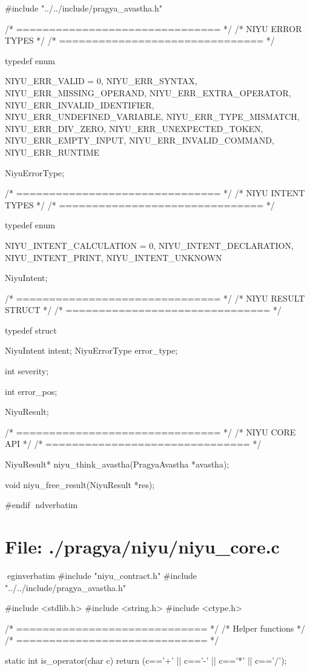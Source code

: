 \documentclass{article}
\begin{document}
#include "../../include/pragya_avastha.h"

/* =============================== */
/* NIYU ERROR TYPES                */
/* =============================== */

typedef enum {

    NIYU_ERR_VALID = 0,
    NIYU_ERR_SYNTAX,
    NIYU_ERR_MISSING_OPERAND,
    NIYU_ERR_EXTRA_OPERATOR,
    NIYU_ERR_INVALID_IDENTIFIER,
    NIYU_ERR_UNDEFINED_VARIABLE,
    NIYU_ERR_TYPE_MISMATCH,
    NIYU_ERR_DIV_ZERO,
    NIYU_ERR_UNEXPECTED_TOKEN,
    NIYU_ERR_EMPTY_INPUT,
    NIYU_ERR_INVALID_COMMAND,
    NIYU_ERR_RUNTIME

} NiyuErrorType;


/* =============================== */
/* NIYU INTENT TYPES               */
/* =============================== */

typedef enum {

    NIYU_INTENT_CALCULATION = 0,
    NIYU_INTENT_DECLARATION,
    NIYU_INTENT_PRINT,
    NIYU_INTENT_UNKNOWN

} NiyuIntent;


/* =============================== */
/* NIYU RESULT STRUCT              */
/* =============================== */

typedef struct {

    NiyuIntent intent;
    NiyuErrorType error_type;

    int severity;

    int error_pos;

} NiyuResult;


/* =============================== */
/* NIYU CORE API                   */
/* =============================== */

NiyuResult* niyu_think_avastha(PragyaAvastha *avastha);

void niyu_free_result(NiyuResult *res);

#endif
nd{verbatim}
\section*{File: ./pragya/niyu/niyu_core.c}
egin{verbatim}
#include "niyu_contract.h"
#include "../../include/pragya_avastha.h"

#include <stdlib.h>
#include <string.h>
#include <ctype.h>

/* ============================= */
/* Helper functions              */
/* ============================= */

static int is_operator(char c)
{
    return (c=='+' || c=='-' || c=='*' || c=='/');
}
\end{document}
